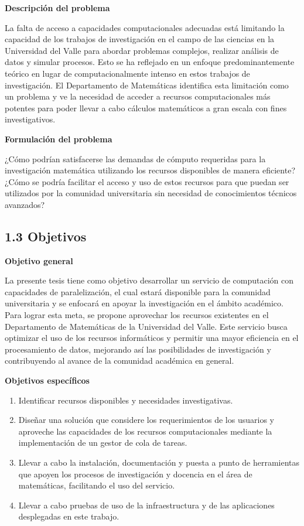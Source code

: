 \begin{spacing}{1.5}
\begin{multicols}{2}
    \textbf{Descripción del problema}

    La falta de acceso a capacidades computacionales adecuadas está limitando la capacidad de los trabajos de investigación en el campo de las ciencias en la Universidad del Valle para abordar problemas complejos, realizar análisis de datos y simular procesos. Esto se ha reflejado en un enfoque predominantemente teórico en lugar de computacionalmente intenso en estos trabajos de investigación. El Departamento de Matemáticas identifica esta limitación como un problema y ve la necesidad de acceder a recursos computacionales más potentes para poder llevar a cabo cálculos matemáticos a gran escala con fines investigativos.

    \textbf{Formulación del problema}

    ¿Cómo podrían satisfacerse las demandas de cómputo requeridas para la investigación matemática utilizando los recursos disponibles de manera eficiente? ¿Cómo se podría facilitar el acceso y uso de estos recursos para que puedan ser utilizados por la comunidad universitaria sin necesidad de conocimientos técnicos avanzados?

    \subsection{1.3 Objetivos}

    \textbf{Objetivo general}

    La presente tesis tiene como objetivo desarrollar un servicio de computación con capacidades de paralelización, el cual estará disponible para la comunidad universitaria y se enfocará en apoyar la investigación en el ámbito académico. Para lograr esta meta, se propone aprovechar los recursos existentes en el Departamento de Matemáticas de la Universidad del Valle. Este servicio busca optimizar el uso de los recursos informáticos y permitir una mayor eficiencia en el procesamiento de datos, mejorando así las posibilidades de investigación y contribuyendo al avance de la comunidad académica en general.

    \textbf{Objetivos específicos}
    \begin{enumerate}
        \item Identificar recursos disponibles y necesidades investigativas.
        \item Diseñar una solución que considere los requerimientos de los usuarios y aproveche las capacidades de los recursos computacionales mediante la implementación de un gestor de cola de tareas.
        \item Llevar a cabo la instalación, documentación y puesta a punto de herramientas que apoyen los procesos de investigación y docencia en el área de matemáticas, facilitando el uso del servicio.
        \item  Llevar a cabo pruebas de uso de la infraestructura y de las aplicaciones desplegadas en este trabajo.
    \end{enumerate}
\end{multicols}


\end{spacing}
